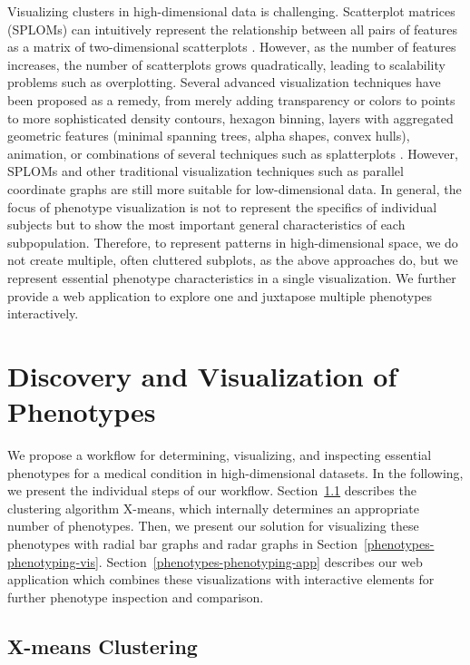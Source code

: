 \documentclass[
  oneside]{book}
\begin{document}
Visualizing clusters in high-dimensional data is challenging.
Scatterplot matrices (SPLOMs) can intuitively represent the
relationship between all pairs of features as a matrix of two-dimensional scatterplots \autocite{Im:GPLOM2013,Klemm:RegressionHeatmap2015}.
However, as the number of features increases, the number of scatterplots grows quadratically, leading to scalability problems such as overplotting.
Several advanced visualization techniques have been proposed as a remedy, from merely adding transparency or colors to points to more sophisticated density contours, hexagon binning, layers with aggregated geometric features (minimal spanning trees, alpha shapes, convex hulls), animation, or combinations of several techniques such as
splatterplots \autocite{Mayorga:Splatterplots2013}.
However, SPLOMs and other traditional visualization techniques such as parallel coordinate graphs \autocite{Hartigan:PCC1975} are still more suitable for low-dimensional data.
In general, the focus of phenotype visualization is not to represent the specifics of individual subjects but to show the most important general characteristics of each subpopulation.
Therefore, to represent patterns in high-dimensional space, we do not create multiple, often cluttered subplots, as the above approaches do, but we represent essential phenotype characteristics in a single visualization.
We further provide a web application to explore one and juxtapose multiple phenotypes interactively.

\hypertarget{phenotypes-phenotyping}{%
\section{Discovery and Visualization of Phenotypes}\label{phenotypes-phenotyping}}

We propose a workflow for determining, visualizing, and inspecting essential phenotypes for a medical condition in high-dimensional datasets.
In the following, we present the individual steps of our workflow.
Section~\ref{phenotypes-phenotyping-xmeans} describes the clustering algorithm X-means, which internally determines an appropriate number of phenotypes.
Then, we present our solution for visualizing these phenotypes with radial bar graphs and radar graphs in Section~\ref{phenotypes-phenotyping-vis}.
Section~\ref{phenotypes-phenotyping-app} describes our web application which combines these visualizations with interactive elements for further phenotype inspection and comparison.

\hypertarget{phenotypes-phenotyping-xmeans}{%
\subsection{X-means Clustering}\label{phenotypes-phenotyping-xmeans}}
\end{document}
